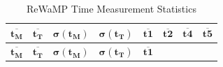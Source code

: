 \begin{xltabular}{\linewidth}[hbt]{@{}llllllll@{}}
\caption{\label{tbl:rewamp-timeresults}ReWaMP Time Measurement Statistics}\tabularnewline
\toprule
\begin{minipage}[b]{0.07\columnwidth}\raggedright
\(\bm{\overline{t_M}}\)\strut
\end{minipage} & \begin{minipage}[b]{0.07\columnwidth}\raggedright
\(\bm{\overline{t_T}}\)\strut
\end{minipage} & \begin{minipage}[b]{0.07\columnwidth}\raggedright
\(\bm{\sigma(t_M)}\)\strut
\end{minipage} & \begin{minipage}[b]{0.07\columnwidth}\raggedright
\(\bm{\sigma(t_T)}\)\strut
\end{minipage} & \begin{minipage}[b]{0.07\columnwidth}\raggedright
\(\bm{\overline{t1}}\)\strut
\end{minipage} & \begin{minipage}[b]{0.07\columnwidth}\raggedright
\(\bm{\overline{t2}}\)\strut
\end{minipage} & \begin{minipage}[b]{0.07\columnwidth}\raggedright
\(\bm{\overline{t4}}\)\strut
\end{minipage} & \begin{minipage}[b]{0.08\columnwidth}\raggedright
\(\bm{\overline{t5}}\)\strut
\end{minipage}\tabularnewline
\midrule
\endfirsthead
\toprule
\begin{minipage}[b]{0.07\columnwidth}\raggedright
\(\bm{\overline{t_M}}\)\strut
\end{minipage} & \begin{minipage}[b]{0.07\columnwidth}\raggedright
\(\bm{\overline{t_T}}\)\strut
\end{minipage} & \begin{minipage}[b]{0.07\columnwidth}\raggedright
\(\bm{\sigma(t_M)}\)\strut
\end{minipage} & \begin{minipage}[b]{0.07\columnwidth}\raggedright
\(\bm{\sigma(t_T)}\)\strut
\end{minipage} & \begin{minipage}[b]{0.07\columnwidth}\raggedright
\(\bm{\overline{t1}}\)\strut
\end{minipage} & \begin{minipage}[b]{0.07\columnwidth}\raggedright

\end{minipage}
\end{xltabular}
